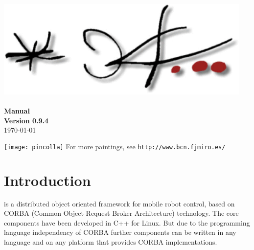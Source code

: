 \documentclass[10pt]{book}
\begin{document}

\thispagestyle{empty}
\begin{center}
  \vfill
  \includegraphics[width=5in]{signature}\\
  \vspace{30 mm}
  {\Xbombastic \miro}\\
  \vspace{10 mm}
  {\LARGE \textbf{Manual}}\\
  \vspace{10 mm}
  \textbf{Version 0.9.4}\\
  \vspace{10 mm}
  \today\\
  \vfill
\end{center}

\newpage

\begin{center}
  \texttt{[image: pincolla]}
  \bigskip
  For more paintings, see {\tt http://www.bcn.fjmiro.es/}
\end{center}

\pagestyle{headings}

\newpage
\tableofcontents


\chapter{Introduction}

\miro is a distributed object oriented framework for mobile robot
control, based on CORBA (Common Object Request Broker
Architecture) \cite{OMG:CORBA-standart} technology. The \miro core
components have been developed in C++ for Linux. But due to the
programming language independency of CORBA further components can be
written in any language and on any platform that provides CORBA
implementations.
\end{document}
